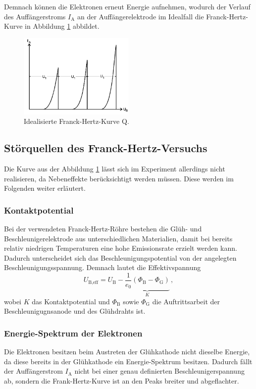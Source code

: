 Demnach können die Elektronen erneut Energie aufnehmen, wodurch der Verlauf des Auffängerstroms $I_{\text{A}}$ an der Auffängerelektrode im Idealfall die Franck-Hertz-Kurve
in Abbildung \ref{fig:idealeKure} abbildet.
\begin{figure}[h]
  \centering
  \includegraphics[width=0.5\textwidth]{content/Bilder/Ideale_Kurve.png}
  \caption{Idealisierte Franck-Hertz-Kurve Q\cite{anleitungV601}.}
  \label{fig:idealeKure}
\end{figure}
\subsection{Störquellen des Franck-Hertz-Versuchs}
\label{sec:Störquellen}
Die Kurve aus der Abbildung \ref{fig:idealeKure} lässt sich im Experiment allerdings nicht realisieren, da Nebeneffekte berücksichtigt werden müssen. Diese werden im Folgenden
weiter erläutert.
\subsubsection{Kontaktpotential}
Bei der verwendeten Franck-Hertz-Röhre bestehen die Glüh- und Beschleunigerelektrode aus unterschiedlichen Materialien, damit bei bereits relativ niedrigen Temperaturen
eine hohe Emissionsrate erzielt werden kann. Dadurch unterscheidet sich das Beschleunigungspotential von der angelegten Beschleunigungsspannung. Demnach lautet die Effektivspannung
\begin{equation}
  U_{\text{B,eff}} = U_{\text{B}} - \underbrace{\frac{1}{e_0}\left(\Phi _{\text{B}}-\Phi_{\text{G}}\right)}_{K}\,,
  \label{eqn:Effektivspannung}
\end{equation}
wobei $K$ das Kontaktpotential und $\Phi_{\text{B}}$ sowie $\Phi_{\text{G}}$ die Auftrittsarbeit der Beschleunigugnsanode und des Glühdrahts ist.
\subsubsection{Energie-Spektrum der Elektronen}
Die Elektronen besitzen beim Austreten der Glühkathode nicht dieselbe Energie, da diese bereits in der Glühkathode ein Energie-Spektrum besitzen. Dadurch fällt der
Auffängerstrom $I_{\text{A}}$ nicht bei einer genau definierten Beschleunigerspannung ab, sondern die Frank-Hertz-Kurve ist an den Peaks breiter und abgeflachter.
